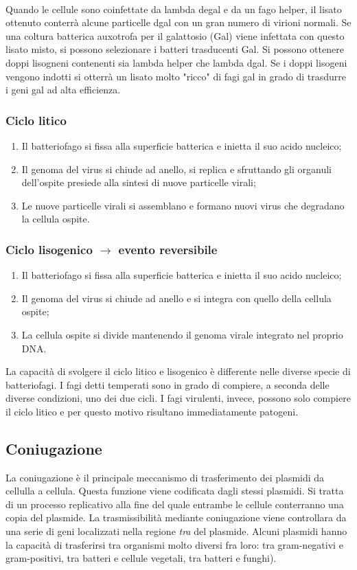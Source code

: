 \begin{enumerate}
    \\Quando le cellule sono coinfettate da lambda degal e da un fago helper, il lisato ottenuto conterrà alcune particelle dgal con un gran numero di virioni normali. Se una coltura batterica auxotrofa per il galattosio (Gal\ap{-}) viene infettata con questo lisato misto, si possono selezionare i batteri trasducenti Gal\ap{+}. Si possono ottenere doppi lisogneni contenenti sia lambda helper che lambda dgal. Se i doppi lisogeni vengono indotti si otterrà un lisato molto "ricco" di fagi gal in grado di trasdurre i geni gal ad alta efficienza.
\end{enumerate}
\subsubsection{Ciclo litico}
\begin{enumerate}
    \item Il batteriofago si fissa alla superficie batterica e inietta il suo acido nucleico; 
    \item Il genoma del virus si chiude ad anello, si replica e sfruttando gli organuli  dell'ospite presiede alla sintesi di nuove particelle virali; 
    \item Le nuove particelle virali si assemblano e formano nuovi virus che degradano la cellula ospite. 
\end{enumerate}
\subsubsection{Ciclo lisogenico $\xrightarrow{}$ evento reversibile}
\begin{enumerate}
    \item Il batteriofago si fissa alla superficie batterica e inietta il suo acido nucleico; 
    \item Il genoma del virus si chiude ad anello e si integra con quello della cellula ospite;
    \item La cellula ospite si divide mantenendo il genoma virale integrato nel proprio DNA.
\end{enumerate}
La capacità di svolgere il ciclo litico e lisogenico è differente nelle diverse specie di batteriofagi. I fagi detti temperati sono in grado di compiere, a seconda delle diverse condizioni, uno dei due cicli. I fagi virulenti, invece, possono solo compiere il ciclo litico e per questo motivo risultano immediatamente patogeni. 
\subsection{Coniugazione}
La coniugazione è il principale meccanismo di trasferimento dei plasmidi da cellulla a cellula. Questa funzione viene codificata dagli stessi plasmidi. Si tratta di un processo replicativo alla fine del quale entrambe le cellule conterranno una copia del plasmide. La trasmissibilità mediante coniugazione viene controllara da una serie di geni localizzati nella regione \textit{tra} del plasmide. Alcuni plasmidi hanno la capacità di trasferirsi tra organismi molto diversi fra loro: tra gram-negativi e gram-positivi, tra batteri e cellule vegetali, tra batteri e funghi).

